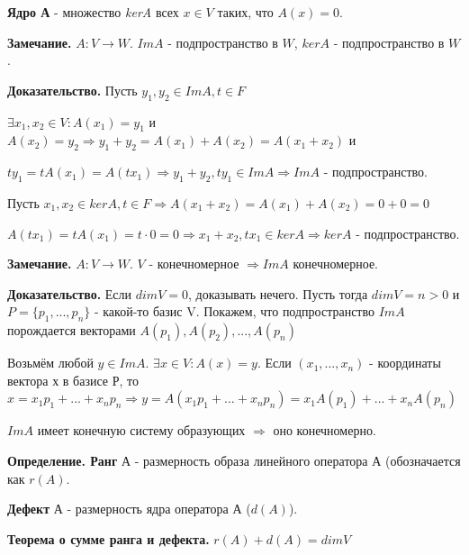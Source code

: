 \documentclass[a4paper]{article}
\begin{document}
\textbf{Ядро А} - множество \textit{kerA} всех $x \in V$ таких, что $A(x) = 0$.

\begin{htheorem}
\textbf{Замечание.} $A: V \rightarrow W$. $ImA$ - подпространство в $W$, $kerA$ - подпространство в $W$.
\end{htheorem}

\begin{hproof}
\textbf{Доказательство.} Пусть $y_1, y_2 \in ImA, t \in F$

$\exists x_1, x_2 \in V: A(x_1) = y_1$ и $A(x_2) = y_2 \Rightarrow y_1+y_2 = A(x_1)+A(x_2) = A(x_1+x_2)$ и

$ty_1 = tA(x_1) = A(tx_1) \Rightarrow y_1+y_2, ty_1 \in ImA \Rightarrow ImA$ - подпространство.

Пусть $x_1, x_2 \in kerA, t \in F \Rightarrow A(x_1 + x_2) = A(x_1) + A(x_2) = 0+0 = 0$

$A(tx_1) = tA(x_1) = t \cdot 0 = 0 \Rightarrow x_1 + x_2, tx_1 \in kerA \Rightarrow kerA$ - подпространство.
\end{hproof}

\begin{htheorem}
\textbf{Замечание.} $A: V \rightarrow W$. $V$ - конечномерное $\Rightarrow ImA$ конечномерное.
\end{htheorem}

\begin{hproof}
\textbf{Доказательство.} Если $dimV = 0$, доказывать нечего.
Пусть тогда $dimV = n>0$ и $P = \{p_1, ..., p_n\}$ - какой-то базис V. Покажем, что подпространство $ImA$ порождается векторами $A(p_1), A(p_2), ..., A(p_n)$

Возьмём любой $y \in ImA$. $\exists x \in V: A(x) = y$. Если $(x_1, ..., x_n)$ - координаты вектора х в базисе Р, то $x = x_1p_1 + ... + x_np_n \Rightarrow y = A(x_1p_1 + ... + x_np_n) = x_1A(p_1) + ... + x_nA(p_n)$

$ImA$ имеет конечную систему образующих $\Rightarrow$ оно конечномерно.
\end{hproof}

\textbf{Определение. Ранг} А - размерность образа линейного оператора А (обозначается как $r(A)$.

\textbf{Дефект} А - размерность ядра оператора А ($d(A)$). 

\begin{htheorem}
\textbf{Теорема о сумме ранга и дефекта.} $r(A) + d(A) = dimV$
\end{htheorem}
\end{document}
